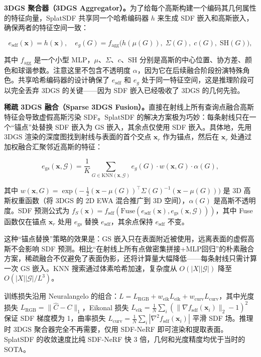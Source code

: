 \textbf{3DGS 聚合器（3DGS Aggregator）。}为了给每个高斯构建一个编码其几何属性的特征向量，SplatSDF 共享同一个哈希编码器 $h$ 来生成 SDF 嵌入和高斯嵌入，确保两者的特征空间一致：

\begin{equation}
e_{\text{sdf}}(\mathbf{x}) = h(\mathbf{x}), \quad e_g(G) = f_{\text{agg}}\big(h(\mu(G)),\; \Sigma(G),\; c(G),\; \text{SH}(G)\big),
\end{equation}

其中 $f_{\text{agg}}$ 是一个小型 MLP，$\mu$、$\Sigma$、$c$、$\text{SH}$ 分别是高斯的中心位置、协方差、颜色和球谐参数。注意这里不包含不透明度 $\alpha$，因为它在后续融合阶段扮演特殊角色。共享哈希编码器的设计确保了 $e_{\text{sdf}}$ 和 $e_g$ 处于同一特征空间，这是推理阶段可以完全丢弃 3DGS 的关键——因为 SDF 嵌入已经吸收了 3DGS 的几何先验。

\textbf{稀疏 3DGS 融合（Sparse 3DGS Fusion）。}直接在射线上所有查询点融合高斯特征会导致虚假高斯污染 SDF。SplatSDF 的解决方案极为巧妙：每条射线只在一个“锚点”处替换 SDF 嵌入为 GS 嵌入，其余点仅使用 SDF 嵌入。具体地，先用 3DGS 渲染的深度图找到射线与表面的首个交点 $\mathbf{x}_r$ 作为锚点，然后在 $\mathbf{x}_r$ 处通过加权融合汇聚邻近高斯的特征：

\begin{equation}
e_{\text{gs}}(\mathbf{x}, \mathcal{G}) = \frac{1}{K}\sum_{G \in \text{KNN}(\mathbf{x}, \mathcal{G})} e_g(G) \cdot w(\mathbf{x}, G) \cdot \alpha(G),
\end{equation}

其中 $w(\mathbf{x}, G) = \exp\!\big({-}\tfrac{1}{2}(\mathbf{x}{-}\mu(G))^\top\Sigma(G)^{-1}(\mathbf{x}{-}\mu(G))\big)$ 是 3D 高斯权重函数（将 3DGS 的 2D EWA 混合推广到 3D 空间），$\alpha(G)$ 是高斯不透明度。SDF 预测公式为 $f_S(\mathbf{x}) = f_{\text{sdf}}(\text{Fuse}(e_{\text{sdf}}(\mathbf{x}), e_{\text{gs}}(\mathbf{x}, \mathcal{G})))$，其中 Fuse 函数仅在锚点 $\mathbf{x}_r$ 处用 $e_{\text{gs}}$ 替换 $e_{\text{sdf}}$，其余点保持 $e_{\text{sdf}}$ 不变。

这种“锚点替换”策略的效果是：GS 嵌入只在表面附近被使用，远离表面的虚假高斯不会影响 SDF 预测。相比“在射线上所有点做密集拼接+MLP回归”的朴素融合方案，稀疏融合不仅避免了表面伪影，还将计算量大幅降低——每条射线只需计算一次 GS 嵌入。KNN 搜索通过体素哈希加速，复杂度从 $O(|X||\mathcal{G}|)$ 降至 $O(|X||\mathcal{G}|/L^3)$。

训练损失沿用 Neuralangelo 的组合：$L = L_{\text{RGB}} + w_{\text{eik}} L_{\text{eik}} + w_{\text{curv}} L_{\text{curv}}$，其中光度损失 $L_{\text{RGB}} = \|\hat{C} - C\|_1$，Eikonal 损失 $L_{\text{eik}} = \frac{1}{N}\sum_i(\|\nabla f_{\text{sdf}}(\mathbf{x}_i)\|_2 - 1)^2$ 保证 SDF 梯度模为 1，曲率损失 $L_{\text{curv}} = \frac{1}{N}\sum_i|\nabla^2 f_{\text{sdf}}(\mathbf{x}_i)|$ 平滑 SDF 场。推理时 3DGS 聚合器完全不再需要，仅用 SDF-NeRF 即可渲染和提取表面。SplatSDF 的收敛速度比纯 SDF-NeRF 快 3 倍，几何和光度精度均优于当时的 SOTA。

